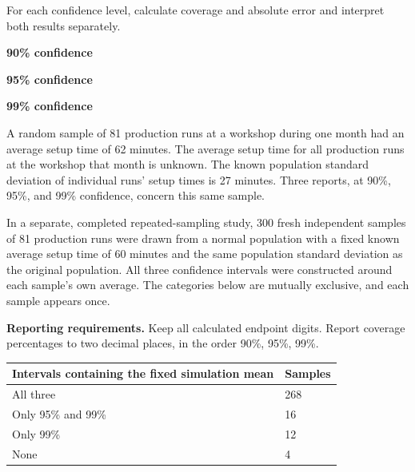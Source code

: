 
For each confidence level, calculate coverage and absolute error and interpret both results separately.
\par\textbf{90\% confidence}\workspace{.65in}
\par\textbf{95\% confidence}\workspace{.65in}
\par\textbf{99\% confidence}\workspace{.65in}
\workspace{.4in}
\vfill

\clearpage
{}
A random sample of 81 production runs at a workshop during one month had an average setup time of 62 minutes. The average setup time for all production runs at the workshop that month is unknown. The known population standard deviation of individual runs' setup times is 27 minutes. Three reports, at 90\%, 95\%, and 99\% confidence, concern this same sample.

In a separate, completed repeated-sampling study, 300 fresh independent samples of 81 production runs were drawn from a normal population with a fixed known average setup time of 60 minutes and the same population standard deviation as the original population. All three confidence intervals were constructed around each sample's own average. The categories below are mutually exclusive, and each sample appears once.

\textbf{Reporting requirements.} Keep all calculated endpoint digits. Report coverage percentages to two decimal places, in the order 90\%, 95\%, 99\%.

\begin{center}\begin{tabular}{@{}ll@{}}\toprule
Intervals containing the fixed simulation mean & Samples\\\midrule
All three & 268\\
Only 95\% and 99\% & 16\\
Only 99\% & 12\\
None & 4\\
\bottomrule\end{tabular}\end{center}


\BlankInformationTable
\clearpage
{}

